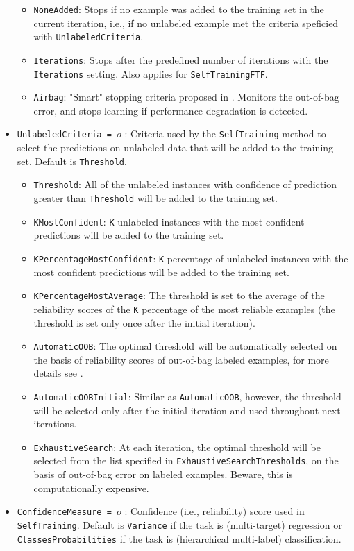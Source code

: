 \begin{itemize}
\begin{itemize}
		\item {\tt NoneAdded}: Stops if no example was added to the training set in the current iteration, i.e., if no unlabeled example met the criteria speficied with {\tt UnlabeledCriteria}. 
		\item {\tt Iterations}: Stops after the predefined number of iterations with the {\tt Iterations} setting. Also applies for {\tt SelfTrainingFTF}.
		\item {\tt Airbag}: "Smart" stopping criteria proposed in \cite{leistner2009semi}. Monitors the out-of-bag error, and stops learning if performance degradation is detected. 
	\end{itemize}
	\item {\tt UnlabeledCriteria = $o$} : Criteria used by the {\tt SelfTraining} method to select the predictions on unlabeled data that will be added to the training set. Default is {\tt Threshold}.
	\begin{itemize}
		\item {\tt Threshold}: All of the unlabeled instances with confidence of prediction greater than {\tt Threshold} will be added to the training set.
		\item {\tt KMostConfident}: {\tt K} unlabeled instances with the most confident predictions will be added to the training set.
		\item {\tt KPercentageMostConfident}: {\tt K} percentage of unlabeled instances with the most confident predictions will be added to the training set.
		\item {\tt KPercentageMostAverage}: The threshold is set to the average of the reliability scores of the {\tt K} percentage of the most reliable examples (the threshold is set only once after the initial iteration).
		\item {\tt AutomaticOOB}: The optimal threshold will be automatically selected on the basis of reliability scores of out-of-bag labeled examples, for more details see \cite{levatic2017_self-training}.
		\item {\tt AutomaticOOBInitial}: Similar as {\tt AutomaticOOB}, however, the threshold will be selected only after the initial iteration and used throughout next iterations.
		\item {\tt ExhaustiveSearch}: At each iteration, the optimal threshold will be selected from the list specified in {\tt ExhaustiveSearchThresholds}, on the basis of out-of-bag error on labeled examples. Beware, this is computationally expensive. 
	\end{itemize}
	\item {\tt ConfidenceMeasure = $o$} : Confidence (i.e., reliability) score used in {\tt SelfTraining}. Default is {\tt Variance} if the task is (multi-target) regression or {\tt ClassesProbabilities} if the task is (hierarchical multi-label) classification.

\end{itemize}
